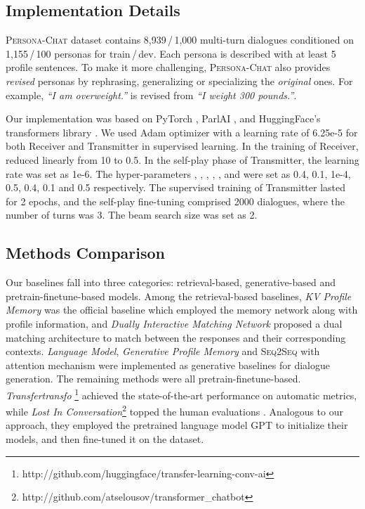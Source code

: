 \documentclass[11pt,a4paper]{article}
\begin{document}
\subsection{Implementation Details}

\textsc{Persona-Chat} dataset contains 8,939\,/\,1,000 multi-turn dialogues conditioned on 1,155\,/\,100 personas for train\,/\,dev. Each persona is described with at least 5 profile sentences. To make it more challenging, \textsc{Persona-Chat} also provides \textit{revised} personas by rephrasing, generalizing or specializing the \textit{original} ones. For example, \textit{``I am overweight.''} is revised from \textit{``I weight 300 pounds.''}.

Our implementation was based on PyTorch \cite{paszke2017automatic}, ParlAI \cite{miller2017parlai}, and HuggingFace's transformers library \cite{Wolf2019HuggingFacesTS}. We used Adam \cite{kingma2014adam} optimizer with a learning rate of 6.25e-5 for both Receiver and Transmitter in supervised learning. In the training of Receiver,  reduced linearly from 10 to 0.5. In the self-play phase of Transmitter, the learning rate was set as 1e-6. The hyper-parameters , , , , ,  and  were set as 0.4, 0.1, 1e-4, 0.5, 0.4, 0.1 and 0.5 respectively. The supervised training of Transmitter lasted for 2 epochs, and the self-play fine-tuning comprised 2000 dialogues, where the number of turns was 3. The beam search size was set as 2.

\subsection{Methods Comparison}\label{sec:model_compare}

Our baselines fall into three categories: retrieval-based, generative-based and pretrain-finetune-based models. Among the retrieval-based baselines, \textit{KV Profile Memory} \cite{zhang2018personalizing} was the official baseline which employed the memory network along with profile information, and \textit{Dually Interactive Matching Network} \cite{gu2019dually} proposed a dual matching architecture to match between the responses and their corresponding contexts. \textit{Language Model}, \textit{Generative Profile Memory} \cite{zhang2018personalizing} and \textsc{Seq2Seq} with attention mechanism \cite{Bahdanau2014NeuralMT} were implemented as generative baselines for dialogue generation. The remaining methods were all pretrain-finetune-based. \textit{Transfertransfo} \cite{wolf2019transfertransfo}\footnote{http://github.com/huggingface/transfer-learning-conv-ai} achieved the state-of-the-art performance on automatic metrics, while \textit{Lost In Conversation}\footnote{http://github.com/atselousov/transformer\_chatbot} topped the human evaluations \cite{dinan2019second}. Analogous to our approach, they employed the pretrained language model GPT to initialize their models, and then fine-tuned it on the dataset.
\end{document}
